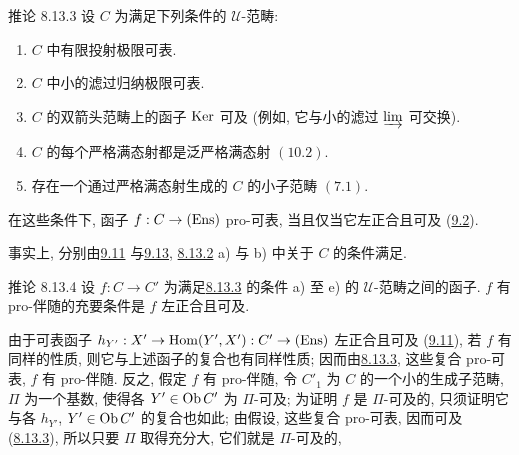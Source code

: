 \begin{enonce*}{推论 8.13.3}
设 $C$ 为满足下列条件的 $𝒰$-范畴:
\begin{enumerate}
\renewcommand{\theenumi}{\alph{enumi}}
\renewcommand{\labelenumi}{\theenumi)}
\item $C$ 中有限投射极限可表.

\item $C$ 中小的滤过归纳极限可表.

\item $C$ 的双箭头范畴上的函子 $\operatorname{Ker}$ 可及
(例如, 它与小的滤过 $\varinjlim$ 可交换).

\item $C$ 的每个严格满态射都是泛严格满态射 $\hyperref[I.sec10.2]{(10.2)}$.

\item 存在一个通过严格满态射生成的 $C$ 的小子范畴 $\hyperref[I.def7.1]{(7.1)}$.
\end{enumerate}
在这些条件下, 函子 $f:C\rightarrow (\operatorname{Ens})$ pro-可表,
当且仅当它左正合且可及 (\hyperref[I.def9.2]{9.2}).
\end{enonce*}

事实上, 分别由\hyperref[I.prop9.11]{9.11} 与\hyperref[I.prop9.13]{9.13},
\hyperref[I.prop8.13.2]{8.13.2} a) 与 b) 中关于 $C$ 的条件满足.


\begin{enonce*}{推论 8.13.4}
设 $f:C\rightarrow C'$ 为满足\hyperref[I.cor8.13.3]{8.13.3}
的条件 {\rm a)} 至 {\rm e)} 的 $𝒰$-范畴之间的函子.
$f$ 有 pro-伴随的充要条件是 $f$ 左正合且可及.
\end{enonce*}

由于\pageoriginale 可表函子
$h_{Y'}:X'\rightarrow \operatorname{Hom}(Y',X'):C'\rightarrow(\operatorname{Ens})$ 左正合且可及
(\hyperref[I.prop9.11]{9.11}), 若 $f$ 有同样的性质,
则它与上述函子的复合也有同样性质;
因而由\hyperref[I.cor8.13.3]{8.13.3}, 这些复合 pro-可表,
\ie $f$ 有 pro-伴随.
反之, 假定 $f$ 有 pro-伴随,
令 $C'_1$ 为 $C$ 的一个小的生成子范畴,
$\Pi$ 为一个基数, 使得各 $Y'\in \operatorname{Ob} C'$ 为 $\Pi$-可及;
为证明 $f$ 是 $\Pi$-可及的,
只须证明它与各 $h_{Y'}$, $Y'\in \operatorname{Ob} C'$ 的复合也如此;
由假设, 这些复合 pro-可表, 因而可及 (\hyperref[I.cor8.13.3]{8.13.3}),
所以只要 $\Pi$ 取得充分大, 它们就是 $\Pi$-可及的, \cqfd




